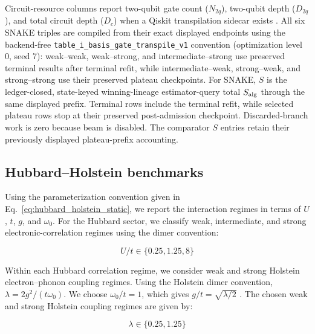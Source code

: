 \documentclass[
  reprint,
  amsmath,
  amssymb,
  aps,
  pra,
  nofootinbib,
  superscriptaddress,
  floatfix
]{revtex4-2}
\begin{document}
Circuit-resource columns report two-qubit gate count (\(N_{2q}\)), two-qubit depth (\(D_{2q}\)), and total circuit depth (\(D_c\)) when a Qiskit transpilation sidecar exists \cite{JavadiAbhari2024Qiskit,QiskitAlgorithmsAdaptVQE}. All six SNAKE triples are compiled from their exact displayed endpoints using the backend-free \texttt{table\_i\_basis\_gate\_transpile\_v1} convention (optimization level 0, seed 7): weak--weak, weak--strong, and intermediate--strong use preserved terminal results after terminal refit, while intermediate--weak, strong--weak, and strong--strong use their preserved plateau checkpoints. For SNAKE, $S$ is the ledger-closed, state-keyed winning-lineage estimator-query total $S_{\rm alg}$ through the same displayed prefix. Terminal rows include the terminal refit, while selected plateau rows stop at their preserved post-admission checkpoint. Discarded-branch work is zero because beam is disabled. The comparator $S$ entries retain their previously displayed plateau-prefix accounting.



\subsection{Hubbard--Holstein benchmarks}
Using the parameterization convention given in Eq.~\eqref{eq:hubbard_holstein_static}, we report the interaction regimes in terms of \(U\), \(t\), \(g\), and \(\omega_0\).
For the Hubbard sector, we classify weak, intermediate, and strong electronic-correlation regimes using the dimer convention:

\begin{equation}
    U/t \in\{0.25,1.25,8\} \label{hubbard_regimes}
\end{equation}

Within each Hubbard correlation regime, we consider weak and strong Holstein electron--phonon coupling regimes. Using the Holstein dimer convention, \(\lambda=2g^2/(t\omega_0)\). We choose \(\omega_0/t=1\), which gives \(g/t=\sqrt{\lambda/2}\) \cite{Sakkinen2015HolsteinDimer}.
The chosen weak and strong Holstein coupling regimes are given by:

\begin{equation}
    \lambda\in\{0.25,1.25\} \label{holstein_sectors}
\end{equation}
\end{document}
